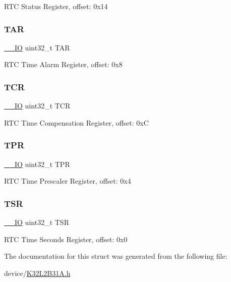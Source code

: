R\+TC Status Register, offset\+: 0x14 \mbox{\label{struct_r_t_c___type_a98069e908f0dbdf30857c4c33e5680b8}} 
\subsubsection{\texorpdfstring{TAR}{TAR}}
{\footnotesize\ttfamily \mbox{\hyperlink{core__cm0plus_8h_aec43007d9998a0a0e01faede4133d6be}{\+\_\+\+\_\+\+IO}} uint32\+\_\+t T\+AR}

R\+TC Time Alarm Register, offset\+: 0x8 \mbox{\label{struct_r_t_c___type_ae9dd9282fab299d0cd6e119564688e53}} 
\subsubsection{\texorpdfstring{TCR}{TCR}}
{\footnotesize\ttfamily \mbox{\hyperlink{core__cm0plus_8h_aec43007d9998a0a0e01faede4133d6be}{\+\_\+\+\_\+\+IO}} uint32\+\_\+t T\+CR}

R\+TC Time Compensation Register, offset\+: 0xC \mbox{\label{struct_r_t_c___type_a72bb9b7d61fe3262cd2a6070a7bd5b69}} 
\subsubsection{\texorpdfstring{TPR}{TPR}}
{\footnotesize\ttfamily \mbox{\hyperlink{core__cm0plus_8h_aec43007d9998a0a0e01faede4133d6be}{\+\_\+\+\_\+\+IO}} uint32\+\_\+t T\+PR}

R\+TC Time Prescaler Register, offset\+: 0x4 \mbox{\label{struct_r_t_c___type_a87e3001757a0cd493785f1f3337dd0e8}} 
\subsubsection{\texorpdfstring{TSR}{TSR}}
{\footnotesize\ttfamily \mbox{\hyperlink{core__cm0plus_8h_aec43007d9998a0a0e01faede4133d6be}{\+\_\+\+\_\+\+IO}} uint32\+\_\+t T\+SR}

R\+TC Time Seconds Register, offset\+: 0x0 

The documentation for this struct was generated from the following file\+:\begin{DoxyCompactItemize}
\item 
device/\mbox{\hyperlink{_k32_l2_b31_a_8h}{K32\+L2\+B31\+A.\+h}}\end{DoxyCompactItemize}
